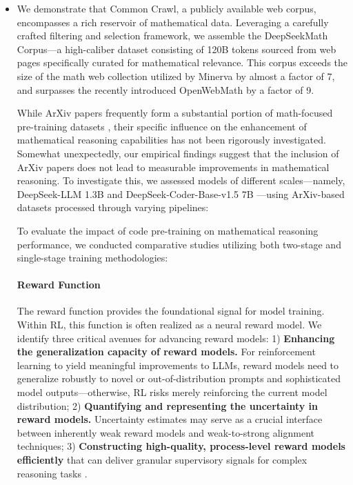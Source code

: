 \begin{itemize}[topsep=0pt]
    \item We demonstrate that Common Crawl, a publicly available web corpus, encompasses a rich reservoir of mathematical data. Leveraging a carefully crafted filtering and selection framework, we assemble the DeepSeekMath Corpus—a high-caliber dataset consisting of 120B tokens sourced from web pages specifically curated for mathematical relevance. This corpus exceeds the size of the math web collection utilized by Minerva \citep{minerva} by almost a factor of 7, and surpasses the recently introduced OpenWebMath \citep{openwebmath} by a factor of 9.

While ArXiv papers frequently form a substantial portion of math-focused pre-training datasets \citep{minerva,gpt-f,llemma,mathpile}, their specific influence on the enhancement of mathematical reasoning capabilities has not been rigorously investigated. Somewhat unexpectedly, our empirical findings suggest that the inclusion of ArXiv papers does not lead to measurable improvements in mathematical reasoning. To investigate this, we assessed models of different scales—namely, DeepSeek-LLM 1.3B and DeepSeek-Coder-Base-v1.5 7B \citep{deepseek-coder}—using ArXiv-based datasets processed through varying pipelines:

To evaluate the impact of code pre-training on mathematical reasoning performance, we conducted comparative studies utilizing both two-stage and single-stage training methodologies:

\paragraph{Reward Function} The reward function provides the foundational signal for model training. Within RL, this function is often realized as a neural reward model. We identify three critical avenues for advancing reward models: 1) \textbf{Enhancing the generalization capacity of reward models.} For reinforcement learning to yield meaningful improvements to LLMs, reward models need to generalize robustly to novel or out-of-distribution prompts and sophisticated model outputs—otherwise, RL risks merely reinforcing the current model distribution; 2) \textbf{Quantifying and representing the uncertainty in reward models.} Uncertainty estimates may serve as a crucial interface between inherently weak reward models and weak-to-strong alignment techniques; 3) \textbf{Constructing high-quality, process-level reward models efficiently} that can deliver granular supervisory signals for complex reasoning tasks \citep{lightman2023let,wang2023math}.


\end{itemize}
